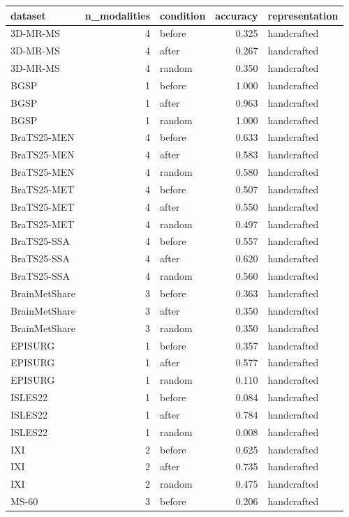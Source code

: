 \begin{tabular}{lrlrl}
\toprule
dataset & n\_modalities & condition & accuracy & representation \\
\midrule
3D-MR-MS & 4 & before & 0.325 & handcrafted \\
3D-MR-MS & 4 & after & 0.267 & handcrafted \\
3D-MR-MS & 4 & random & 0.350 & handcrafted \\
BGSP & 1 & before & 1.000 & handcrafted \\
BGSP & 1 & after & 0.963 & handcrafted \\
BGSP & 1 & random & 1.000 & handcrafted \\
BraTS25-MEN & 4 & before & 0.633 & handcrafted \\
BraTS25-MEN & 4 & after & 0.583 & handcrafted \\
BraTS25-MEN & 4 & random & 0.580 & handcrafted \\
BraTS25-MET & 4 & before & 0.507 & handcrafted \\
BraTS25-MET & 4 & after & 0.550 & handcrafted \\
BraTS25-MET & 4 & random & 0.497 & handcrafted \\
BraTS25-SSA & 4 & before & 0.557 & handcrafted \\
BraTS25-SSA & 4 & after & 0.620 & handcrafted \\
BraTS25-SSA & 4 & random & 0.560 & handcrafted \\
BrainMetShare & 3 & before & 0.363 & handcrafted \\
BrainMetShare & 3 & after & 0.350 & handcrafted \\
BrainMetShare & 3 & random & 0.350 & handcrafted \\
EPISURG & 1 & before & 0.357 & handcrafted \\
EPISURG & 1 & after & 0.577 & handcrafted \\
EPISURG & 1 & random & 0.110 & handcrafted \\
ISLES22 & 1 & before & 0.084 & handcrafted \\
ISLES22 & 1 & after & 0.784 & handcrafted \\
ISLES22 & 1 & random & 0.008 & handcrafted \\
IXI & 2 & before & 0.625 & handcrafted \\
IXI & 2 & after & 0.735 & handcrafted \\
IXI & 2 & random & 0.475 & handcrafted \\
MS-60 & 3 & before & 0.206 & handcrafted \\

\end{tabular}
